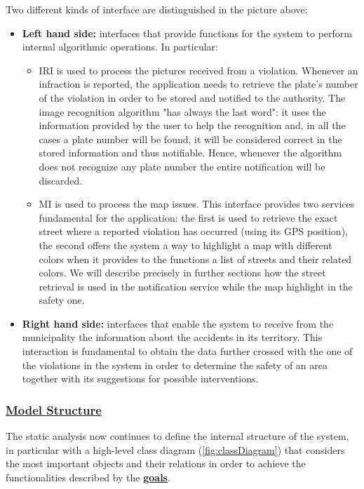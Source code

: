 		Two different kinds of interface are distinguished in the picture above:
		\begin{itemize}
			\item \textbf{Left hand side:} interfaces that provide functions for the system to perform internal algorithmic operations. In particular:
			\begin{itemize}
				\item \textsc{IRI} is used to process the pictures received from a violation. Whenever an infraction is reported, the application needs to retrieve the plate's number of the violation in order to be stored and notified to the authority. The image recognition algorithm "has always the last word": it uses the information provided by the user to help the recognition and, in all the cases a plate number will be found, it will be considered correct in the stored information and thus notifiable. Hence, whenever the algorithm does not recognize any plate number the entire notification will be discarded.
			
				\item \textsc{MI} is used to process the map issues. This interface provides two services fundamental for the application: the first is used to retrieve the exact street where a reported violation has occurred (using its GPS position), the second offers the system a way to highlight a map with different colors when it provides to the functions a list of streets and their related colors. We will describe precisely in further sections how the street retrieval is used in the notification service while the map highlight in the safety one.
			\end{itemize}
			
			\item \textbf{Right hand side:} interfaces that enable the system to receive from the municipality the information about the accidents in its territory. This interaction is fundamental to obtain the data further crossed with the one of the violations in the system in order to determine the safety of an area together with its suggestions for possible interventions.
			
		\end{itemize}
	
	\subsubsection[Model Structure]{\hyperlink{toc}{Model Structure}}
	The static analysis now continues to define the internal structure of the system, in particular with a high-level class diagram (\autoref{fig:classDiagram}) that considers the most important objects and their relations in order to achieve the functionalities described by the \hyperref[sec:goals]{\textbf{goals}}.\\
	
